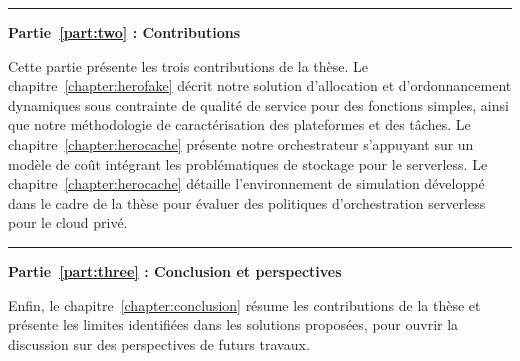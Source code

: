 \begin{center}
    \rule{4cm}{0.4pt}
\end{center}

\textbf{Partie~\ref{part:two} : Contributions}

Cette partie présente les trois contributions de la thèse. Le chapitre~\ref{chapter:herofake} décrit notre solution d'allocation et d'ordonnancement dynamiques sous contrainte de qualité de service pour des fonctions simples, ainsi que notre méthodologie de caractérisation des plateformes et des tâches. Le chapitre~\ref{chapter:herocache} présente notre orchestrateur s'appuyant sur un modèle de coût intégrant les problématiques de stockage pour le serverless. Le chapitre~\ref{chapter:herocache} détaille l'environnement de simulation développé dans le cadre de la thèse pour évaluer des politiques d'orchestration serverless pour le cloud privé.

\begin{center}
    \rule{4cm}{0.4pt}
\end{center}

\textbf{Partie~\ref{part:three} : Conclusion et perspectives}

Enfin, le chapitre~\ref{chapter:conclusion} résume les contributions de la thèse et présente les limites identifiées dans les solutions proposées, pour ouvrir la discussion sur des perspectives de futurs travaux.
